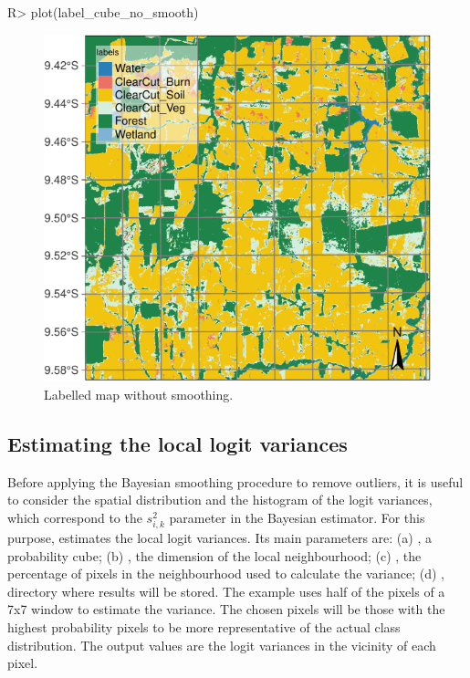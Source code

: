 \documentclass[
]{jss}
\begin{document}
\begin{CodeChunk}
\begin{CodeInput}
R> plot(label_cube_no_smooth)
\end{CodeInput}
\begin{figure}[h]

{\centering \includegraphics{Bayesian_smoothing_JSS_files/figure-latex/map1-1} 

}

\caption[Labelled map without smoothing]{Labelled map without smoothing.}\label{fig:map1}
\end{figure}
\end{CodeChunk}

\hypertarget{estimating-the-local-logit-variances}{%
\subsection{Estimating the local logit variances}\label{estimating-the-local-logit-variances}}

Before applying the Bayesian smoothing procedure to remove outliers, it is useful to consider the spatial distribution and the histogram of the logit variances, which correspond to the \(s^2_{i,k}\) parameter in the Bayesian estimator. For this purpose,  estimates the local logit variances. Its main parameters are: (a) , a probability cube; (b) , the dimension of the local neighbourhood; (c) , the percentage of pixels in the neighbourhood used to calculate the variance; (d) , directory where results will be stored. The example uses half of the pixels of a 7x7 window to estimate the variance. The chosen pixels will be those with the highest probability pixels to be more representative of the actual class distribution. The output values are the logit variances in the vicinity of each pixel.
\end{document}
